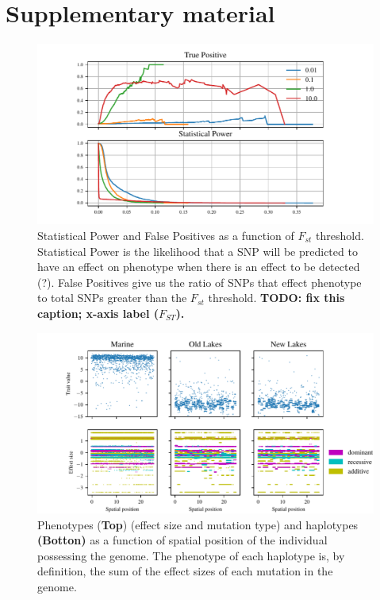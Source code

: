 \documentclass{article}
\begin{document}

{}

\clearpage
\appendix
\setcounter{table}{0}
\renewcommand{\thetable}{S\arabic{table}}
\setcounter{figure}{0}
\renewcommand{\thefigure}{S\arabic{figure}}


\section*{Supplementary material}

\begin{figure}
	\begin{center}
  		\includegraphics{Final_Plots/True_Power.pdf}
  		\caption{ 
		Statistical Power and False Positives as a function of $F_{st}$ threshold. 
		Statistical Power is the likelihood that a SNP will be predicted to have an effect on phenotype when there is an effect to be detected (?).
		False Positives give us the ratio of SNPs that effect phenotype to total SNPs greater than the $F_{st}$ threshold.
            \textbf{
                TODO: fix this caption; x-axis label ($F_{ST}$).}
		}
  		\label{fig:Power_FP}
	\end{center}
\end{figure}

\begin{figure}
	\begin{center}
  		\includegraphics[width=1.0\linewidth]{Final_Plots/Haplo_small.pdf}
  		\caption{
			Phenotypes (\textbf{Top}) (effect size and mutation type) and haplotypes \textbf{(Botton)} as a function of spatial position of the individual 
			possessing the genome. The phenotype of each haplotype is, by definition, the sum of the 
			effect sizes of each mutation in the genome. 
		}
  		\label{fig:Haplo_Pheno}
	\end{center}
\end{figure}
\end{document}
